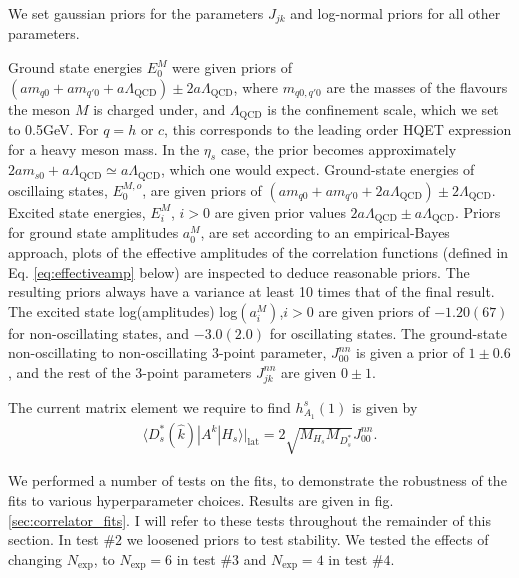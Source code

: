 We set gaussian priors for the parameters $J_{jk}$ and log-normal priors for all other parameters.

Ground state energies $E_0^M$ were given priors of $(am_{q0} + am_{q'0} + a\Lambda_{\text{QCD}} )\pm 2a\Lambda_{\text{QCD}}$, where $m_{q0,q'0}$ are the masses of the flavours the meson $M$ is charged under, and $\Lambda_{\text{QCD}}$ is the confinement scale, which we set to 0.5GeV. For $q=h$ or $c$, this corresponds to the leading order HQET expression for a heavy meson mass. In the $\eta_s$ case, the prior becomes approximately $2am_{s0} + a\Lambda_{\text{QCD}} \simeq a\Lambda_{\text{QCD}}$, which one would expect. Ground-state energies of oscillaing states, $E_0^{M,o}$, are given priors of $(am_{q0} + am_{q'0} + 2 a\Lambda_{\text{QCD}})\pm 2\Lambda_{\text{QCD}}$. Excited state energies, $E_i^M$, $i>0$ are given prior values $2a\Lambda_{\text{QCD}}\pm a\Lambda_{\text{QCD}}$. Priors for ground state amplitudes $a_0^M$, are set according to an empirical-Bayes approach, plots of the effective amplitudes of the correlation functions (defined in Eq. \ref{eq:effectiveamp} below) are inspected to deduce reasonable priors. The resulting priors always have a variance at least 10 times that of the final result. The excited state log(amplitudes) log$(a_i^M)$,$i>0$ are given priors of $-1.20(67)$ for non-oscillating states, and $-3.0(2.0)$ for oscillating states. The ground-state non-oscillating to non-oscillating 3-point parameter, $J_{00}^{nn}$ is given a prior of $1\pm 0.6$, and the rest of the 3-point parameters $J_{jk}^{nn}$ are given $0\pm 1$.

The current matrix element we require to find $h_{A_1}^s(1)$ is given by
\begin{align}
  \langle D_s^*(\hat{k}) | A^k | H_s \rangle |_{\text{lat}} = 2 \sqrt{M_{H_s}M_{D_s^*}} J^{nn}_{00}.
  \label{eq:currentfit}
\end{align}

We performed a number of tests on the fits, to demonstrate the robustness of the fits to various hyperparameter choices. Results are given in fig. \ref{sec:correlator_fits}. I will refer to these tests throughout the remainder of this section. In test $\#2$ we loosened priors to test stability. We tested the effects of changing $N_{\text{exp}}$, to $N_{\text{exp}}=6$ in test $\#3$ and $N_{\text{exp}}=4$ in test $\#4$.

